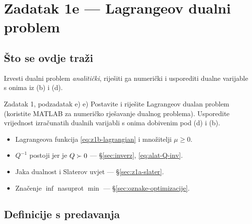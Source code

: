 \chapter{Zadatak 1e --- Lagrangeov dualni problem}
\label{ch:z1-dual}

\section{Što se ovdje traži}

Izvesti dualni problem \emph{analitički}, riješiti ga numerički i usporediti
dualne varijable s onima iz (b) i (d).

\begin{zadatak}{Zadatak 1, podzadatak e)}
e) Postavite i riješite Lagrangeov dualan problem (koristite MATLAB za numeričko
rješavanje dualnog problema). Usporedite vrijednost izračunatih dualnih varijabli
s onima dobivenim pod (d) i (b).
\end{zadatak}

\begin{predznanje}
\begin{itemize}[nosep,leftmargin=*]
  \item Lagrangeova funkcija \eqref{eq:z1b-lagrangian} i množitelji $\mu \geq 0$.
  \item $Q^{-1}$ postoji jer je $Q \succ 0$ --- \S\ref{sec:inverz}, \eqref{eq:alat-Q-inv}.
  \item Jaka dualnost i Slaterov uvjet --- \S\ref{sec:z1a-slater}.
  \item Značenje $\inf$ nasuprot $\min$ --- \S\ref{sec:oznake-optimizacije}.
\end{itemize}
\end{predznanje}

\section{Definicije s predavanja}
\label{sec:z1e-definicije}

